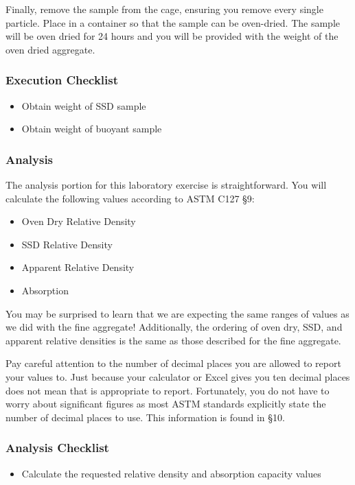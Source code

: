 \documentclass[12pt]{article}
\begin{document}
Finally, remove the sample from the cage, ensuring you remove every single particle. Place in a container so that the sample can be oven-dried. The sample will be oven dried for 24 hours and you will be provided with the weight of the oven dried aggregate.

\subsubsection*{Execution Checklist}
\begin{itemize}
    \item Obtain weight of SSD sample
    \item Obtain weight of buoyant sample
\end{itemize}

\subsubsection{Analysis}
The analysis portion for this laboratory exercise is straightforward. You will calculate the following values according to ASTM C127 \S 9:
\begin{itemize}
    \item Oven Dry Relative Density
    \item SSD Relative Density
    \item Apparent Relative Density
    \item Absorption
\end{itemize}

You may be surprised to learn that we are expecting the same ranges of values as we did with the fine aggregate! Additionally, the ordering of oven dry, SSD, and apparent relative densities is the same as those described for the fine aggregate.

Pay careful attention to the number of decimal places you are allowed to report your values to. Just because your calculator or Excel gives you ten decimal places does not mean that is appropriate to report. Fortunately, you do not have to worry about significant figures as most ASTM standards explicitly state the number of decimal places to use. This information is found in \S10.

\subsubsection*{Analysis Checklist}
\begin{itemize}
    \item Calculate the requested relative density and absorption capacity values
\end{itemize}
\end{document}
